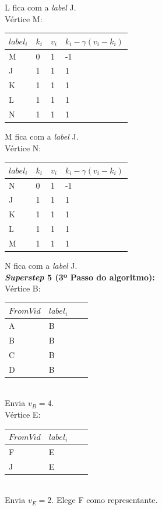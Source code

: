 \documentclass[a4paper,10pt]{report}
\begin{document}
  L fica com a \textit{label} J.
\\[0.25cm]
Vértice M:
  \begin{tabular}{| l | l | l | l |}
  \hline
  $label_i$ & $k_i$ & $v_i$ & $k_i - \gamma(v_i - k_i)$\\ \hline
  M & 0 & 1 & -1 \\ \hline
  J & 1 & 1 & 1  \\ \hline
  K & 1 & 1 & 1  \\ \hline
  L & 1 & 1 & 1  \\ \hline
  N & 1 & 1 & 1  \\ \hline
  \end{tabular}  
  M fica com a \textit{label} J.
\\[0.25cm]
Vértice N:
  \begin{tabular}{| l | l | l | l |}
  \hline
  $label_i$ & $k_i$ & $v_i$ & $k_i - \gamma(v_i - k_i)$\\ \hline
  N & 0 & 1 & -1 \\ \hline
  J & 1 & 1 & 1  \\ \hline
  K & 1 & 1 & 1  \\ \hline
  L & 1 & 1 & 1  \\ \hline
  M & 1 & 1 & 1  \\ \hline
  \end{tabular}  
  N fica com a \textit{label} J.
\\[0.25cm]
\newpage
{\bf \textit{Superstep} 5 (3º Passo do algoritmo):} 
\\[0.25cm]
Vértice B:
  \begin{tabular}{| l | l | l | l |}
  \hline
  $From Vid$ & $label_i$\\ \hline
  A & B \\ \hline
  B & B \\ \hline
  C & B \\ \hline
  D & B \\ \hline
  \end{tabular}  
\\[0.25cm]
  Envia $v_B = 4$.
\\[0.25cm]
Vértice E:
  \begin{tabular}{| l | l | l | l |}
  \hline
  $From Vid$ & $label_i$\\ \hline
  F & E \\ \hline
  J & E \\ \hline
  \end{tabular}  
\\[0.25cm]
  Envia $v_E = 2$. Elege F como representante.
\\[0.25cm]
\end{document}
